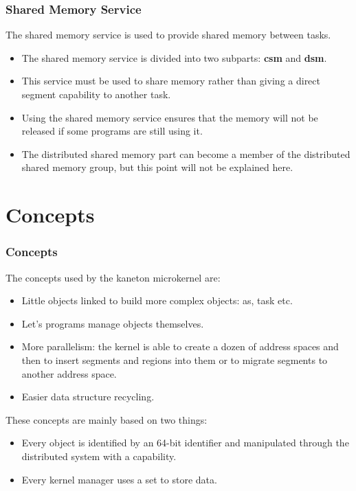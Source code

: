
\begin{frame}
  \frametitle{Shared Memory Service}

  The shared memory service is used to provide shared memory between tasks.

  \-

  \begin{itemize}[<+->]
    \item
      The shared memory service is divided into two subparts:
      \textbf{csm} and \textbf{dsm}.
    \item
      This service must be used to share memory rather than giving a
      direct segment capability to another task.
    \item
      Using the shared memory service ensures that the memory will not
      be released if some programs are still using it.
    \item
      The distributed shared memory part can become a member of the
      distributed shared memory group, but this point will not be
      explained here.
  \end{itemize}
\end{frame}

%
%

\section{Concepts}


\begin{frame}
  \frametitle{Concepts}

  The concepts used by the kaneton microkernel are:

  \begin{itemize}[<+->]
    \item
      Little objects linked to build more complex objects:
      as, task etc.
    \item
      Let's programs manage objects themselves.
    \item
      More parallelism: the kernel is able to create a dozen
      of address spaces and then to insert segments and regions
      into them or to migrate segments to another address space.
    \item
      Easier data structure recycling.
  \end{itemize}

  These concepts are mainly based on two things:

  \begin{itemize}[<+->]
    \item
      Every object is identified by an 64-bit identifier and manipulated
      through the distributed system with a capability.
    \item
      Every kernel manager uses a set to store data.
  \end{itemize}
\end{frame}

